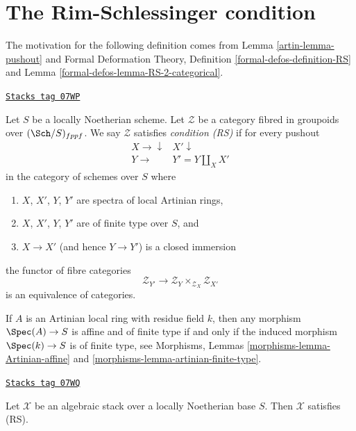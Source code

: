 \section{The Rim-Schlessinger condition}
\label{artin-section-RS}
The motivation for the following definition comes from
Lemma \ref{artin-lemma-pushout}
and
Formal Deformation Theory, Definition \ref{formal-defos-definition-RS} and
Lemma \ref{formal-defos-lemma-RS-2-categorical}.

\begin{definition}[RS]
\label{artin-definition-RS}
\href{https://stacks.math.columbia.edu/tag/07WP}{\texttt{Stacks tag 07WP}}

Let $S$ be a locally Noetherian scheme. Let $\mathcal{Z}$ be a category
fibred in groupoids over $(\Sch/S)_{fppf}$. We say $\mathcal{Z}$
satisfies {\it condition (RS)} if for every pushout
$$
\begin{array}{cc}X \longrightarrow\downarrow & X' \downarrow \\ Y \longrightarrow & Y' = Y \amalg_X X'\end{array}
$$
in the category of schemes over $S$ where
\begin{enumerate}
\item $X$, $X'$, $Y$, $Y'$ are spectra of local Artinian rings,
\item $X$, $X'$, $Y$, $Y'$ are of finite type over $S$, and
\item $X \to X'$ (and hence $Y \to Y'$) is a closed immersion
\end{enumerate}
the functor of fibre categories
$$
\mathcal{Z}_{Y'}
\longrightarrow
\mathcal{Z}_Y \times_{\mathcal{Z}_X} \mathcal{Z}_{X'}
$$
is an equivalence of categories.
\end{definition}

If $A$ is an Artinian local ring with residue field $k$, then
any morphism $\Spec(A) \to S$ is affine and of finite type if and
only if the induced morphism $\Spec(k) \to S$ is of finite type, see
Morphisms, Lemmas \ref{morphisms-lemma-Artinian-affine} and
\ref{morphisms-lemma-artinian-finite-type}.

\begin{lemma}
\label{artin-lemma-algebraic-stack-RS}
\href{https://stacks.math.columbia.edu/tag/07WQ}{\texttt{Stacks tag 07WQ}}

Let $\mathcal{X}$ be an algebraic stack over a locally Noetherian base
$S$. Then $\mathcal{X}$ satisfies (RS).
\end{lemma}


